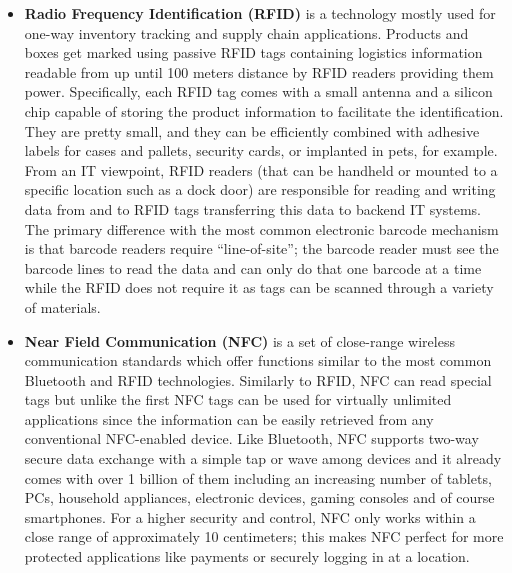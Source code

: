 \begin{itemize}
  \item \textbf{Radio Frequency Identification (RFID) } is a technology mostly used for one-way inventory tracking and supply chain applications. Products and boxes get marked using passive RFID tags containing logistics information readable from up until 100 meters distance by RFID readers providing them power. Specifically, each RFID tag comes with a small antenna and a silicon chip capable of storing the product information to facilitate the identification.  They are pretty small, and they can be efficiently combined with adhesive labels for cases and pallets, security cards, or implanted in pets, for example.  From an IT viewpoint, RFID readers (that can be handheld or mounted to a specific location such as a dock door) are responsible for reading and writing data from and to RFID tags transferring this data to backend IT systems.
  The primary difference with the most common electronic barcode mechanism is that barcode readers require “line-of-site”; the barcode reader must see the barcode lines to read the data and can only do that one barcode at a time while the RFID does not require it as tags can be scanned through a variety of materials.

  \item \textbf{Near Field Communication (NFC) } is a set of close-range wireless communication standards which offer functions similar to the most common Bluetooth and RFID technologies. Similarly to RFID, NFC can read special tags but unlike the first NFC tags can be used for virtually unlimited applications since the information can be easily retrieved from any conventional NFC-enabled device. Like Bluetooth, NFC supports two-way secure data exchange with a simple tap or wave among devices and it already comes with over 1 billion of them including an increasing number of tablets, PCs, household appliances, electronic devices, gaming consoles and of course smartphones. For a higher security and control, NFC only works within a close range of approximately 10 centimeters; this makes NFC perfect for more protected applications like payments or securely logging in at a location. 


\end{itemize}
